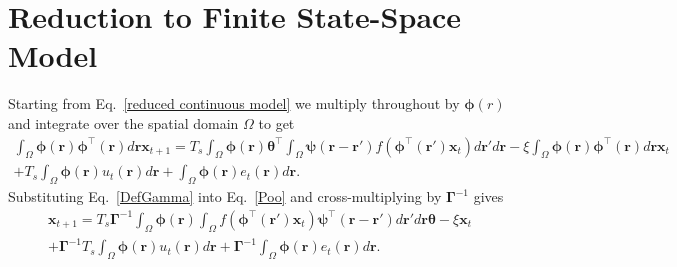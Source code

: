 \documentclass[12pt]{iopart}		%
\begin{document}
\section{Reduction to Finite State-Space Model}\label{Simplifying Decomposition}
Starting from Eq.~\ref{reduced continuous model} we multiply throughout by $\boldsymbol{\phi}(r)$ and integrate over the spatial domain $\Omega$ to get
\begin{eqnarray}\label{ReducingState}
	\int_\Omega  {\boldsymbol{\phi} \left(\mathbf{r}\right)\boldsymbol{\phi}^{\top}\left(\mathbf{r}\right) d\mathbf{r}} \mathbf{x}_{t+1} = T_s \int_\Omega  {\boldsymbol{\phi} (\mathbf{r}) \boldsymbol{\theta}^{\top} \int_\Omega  {\boldsymbol{\psi}  \left(\mathbf{r}-\mathbf{r}'\right) f\left(\boldsymbol{\phi}^{\top}\left(\mathbf{r}'\right) \mathbf{x}_t \right)d\mathbf{r}'}d\mathbf{r}} - \xi\int_\Omega {\boldsymbol{\phi}(\mathbf{r})\boldsymbol{\phi}^{\top}(\mathbf{r})d\mathbf{r}} \mathbf{x}_t \\
	+ T_s \int_\Omega{\boldsymbol{\phi} \left(\mathbf{r}\right) u_t\left(\mathbf{r}\right)d\mathbf{r}} + \int_\Omega{\boldsymbol{\phi} \left(\mathbf{r}\right) e_t\left(\mathbf{r}\right)d\mathbf{r}}.
\end{eqnarray}
Substituting Eq.~\ref{DefGamma} into Eq.~\ref{Poo} and cross-multiplying by $\boldsymbol{\Gamma}^{-1}$ gives 
\begin{eqnarray}\label{Homogeneous SS Model}
	\mathbf{x}_{t+1} = T_s\boldsymbol{\Gamma}^{ - 1}\int_\Omega {\boldsymbol{\phi}\left(\mathbf{r}\right) \int_\Omega {f\left(\boldsymbol{\phi}^{\top}\left(\mathbf{r}'\right)\mathbf{x}_t\right) \boldsymbol{\psi}^{\top} \left(\mathbf{r}-\mathbf{r}'\right)d\mathbf{r}'} d\mathbf{r}} \boldsymbol{\theta} - \xi \mathbf{x}_t \\
	+ \boldsymbol{\Gamma}^{-1}T_s \int_\Omega{\boldsymbol{\phi} \left(\mathbf{r}\right) u_t\left(\mathbf{r}\right)d\mathbf{r}} + \boldsymbol{\Gamma}^{-1} \int_\Omega{\boldsymbol{\phi}\left(\mathbf{r}\right)e_t\left(\mathbf{r}\right)d\mathbf{r}}.
\end{eqnarray}
\end{document}
